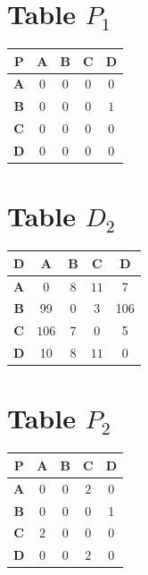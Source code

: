 \documentclass{article}
\begin{document}
\section{Table $P_{1}$}
\begin{center}
    \begin{tabular}{|c||c|c|c|c|}
        \hline
        \textbf{P} & \textbf{A} & \textbf{B} & \textbf{C} & \textbf{D} \\
        \hline
        \hline
        \textbf{A}& 0 & 0 & 0 & 0 \\
        \hline
        \textbf{B}& 0 & 0 & 0 & \cellcolor[HTML]{D74894}$1$ \\
        \hline
        \textbf{C}& 0 & 0 & 0 & 0 \\
        \hline
        \textbf{D}& 0 & 0 & 0 & 0 \\
        \hline
    \end{tabular}
\end{center}


\section{Table $D_{2}$}
\begin{center}
    \begin{tabular}{|c||c|c|c|c|}
        \hline
        \textbf{D} & \textbf{A} & \textbf{B} & \textbf{C} & \textbf{D} \\
        \hline
        \hline
        \textbf{A}& 0 & 8 & \cellcolor[HTML]{D74894}$11$ & 7 \\
        \hline
        \textbf{B}& 99 & 0 & 3 & 106 \\
        \hline
        \textbf{C}& \cellcolor[HTML]{D74894}$106$ & 7 & 0 & 5 \\
        \hline
        \textbf{D}& 10 & 8 & \cellcolor[HTML]{D74894}$11$ & 0 \\
        \hline
    \end{tabular}
\end{center}


\section{Table $P_{2}$}
\begin{center}
    \begin{tabular}{|c||c|c|c|c|}
        \hline
        \textbf{P} & \textbf{A} & \textbf{B} & \textbf{C} & \textbf{D} \\
        \hline
        \hline
        \textbf{A}& 0 & 0 & \cellcolor[HTML]{D74894}$2$ & 0 \\
        \hline
        \textbf{B}& 0 & 0 & 0 & 1 \\
        \hline
        \textbf{C}& \cellcolor[HTML]{D74894}$2$ & 0 & 0 & 0 \\
        \hline
        \textbf{D}& 0 & 0 & \cellcolor[HTML]{D74894}$2$ & 0 \\
        \hline
    \end{tabular}
\end{center}
\end{document}
